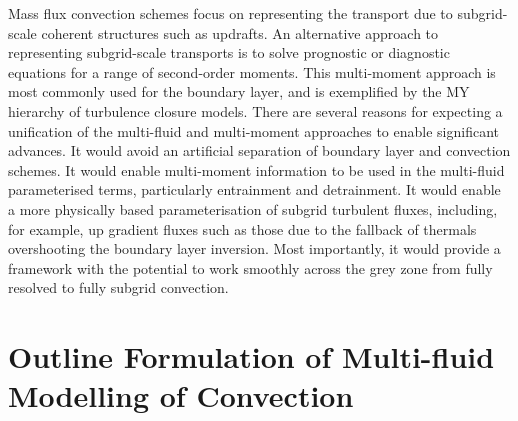 \documentclass[11pt,a4paper]{article}
\begin{document}
Mass flux convection schemes focus on representing the transport due to subgrid-scale coherent structures such as
updrafts. An alternative approach to representing subgrid-scale transports is to solve prognostic or diagnostic
equations for a range of second-order moments. This multi-moment approach is most commonly used for the
boundary layer, and is exemplified by the \citet{mellor1973,mellor1974,mellor1982} MY hierarchy of turbulence
closure models.
There are several reasons for expecting a unification of the multi-fluid and multi-moment approaches to enable
significant advances. It would avoid an artificial separation of boundary layer and convection schemes.
It would enable multi-moment information to be used in the multi-fluid parameterised terms, particularly
entrainment and detrainment. It would enable a more physically based parameterisation of subgrid turbulent
fluxes, including, for example, up gradient fluxes such as those due to the fallback of thermals
overshooting the boundary layer inversion. Most importantly, it would provide a framework
with the potential to work smoothly across the grey zone from fully resolved to fully subgrid convection.

\section{Outline Formulation of Multi-fluid Modelling of Convection}
\label{sec:mf}
\end{document}

